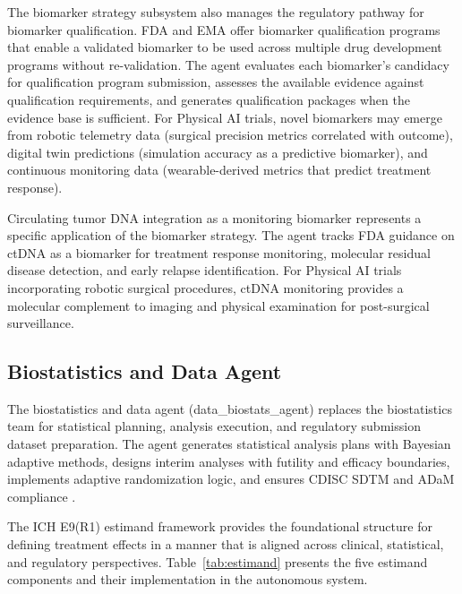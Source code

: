 The biomarker strategy subsystem also manages the regulatory pathway for biomarker
qualification. FDA and EMA offer biomarker qualification programs that enable a validated
biomarker to be used across multiple drug development programs without re-validation. The
agent evaluates each biomarker's candidacy for qualification program submission, assesses
the available evidence against qualification requirements, and generates qualification
packages when the evidence base is sufficient. For Physical AI trials, novel biomarkers may
emerge from robotic telemetry data (surgical precision metrics correlated with outcome),
digital twin predictions (simulation accuracy as a predictive biomarker), and continuous
monitoring data (wearable-derived metrics that predict treatment response).

Circulating tumor DNA integration as a monitoring biomarker represents a specific
application of the biomarker strategy. The agent tracks FDA guidance on ctDNA as a
biomarker for treatment response monitoring, molecular residual disease detection, and
early relapse identification. For Physical AI trials incorporating robotic surgical
procedures, ctDNA monitoring provides a molecular complement to imaging and physical
examination for post-surgical surveillance.

\subsection{Biostatistics and Data Agent}

The biostatistics and data agent (data\_biostats\_agent) replaces the biostatistics team for
statistical planning, analysis execution, and regulatory submission dataset preparation.
The agent generates statistical analysis plans with Bayesian adaptive methods, designs
interim analyses with futility and efficacy boundaries, implements adaptive randomization
logic, and ensures CDISC SDTM and ADaM compliance \cite{cdisc-sdtm, cdisc-adam}.

The ICH E9(R1) estimand framework \cite{ich-e9r1} provides the foundational structure for
defining treatment effects in a manner that is aligned across clinical, statistical, and
regulatory perspectives. Table~\ref{tab:estimand} presents the five estimand components
and their implementation in the autonomous system.

